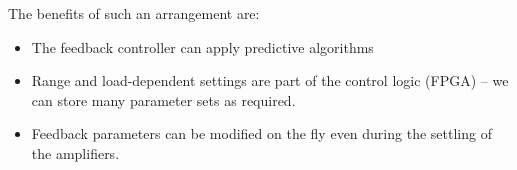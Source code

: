 The benefits of such an arrangement are:
\begin{itemize}[topsep=8pt,itemsep=4pt,partopsep=4pt, parsep=4pt]
    \item
    The feedback controller can apply predictive algorithms
    \item
    Range and load-dependent settings are part of the control logic (\ac{FPGA})
    – we can store many parameter sets as required.
    \item
    Feedback parameters can be modified on the fly even during the settling
    of the amplifiers.
\end{itemize}

